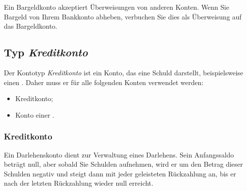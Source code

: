 Ein Bargeldkonto akzeptiert Überweisungen von anderen Konten. Wenn Sie Bargeld von Ihrem Bankkonto abheben, verbuchen Sie dies als Überweisung auf das Bargeldkonto.


\subsection{Typ \emph{Kreditkonto}\label{accounts-type-liabilities}}

Der Kontotyp \emph{Kreditkonto} ist ein Konto, das eine Schuld darstellt, beispielsweise einen . Daher muss er für alle folgenden Konten verwendet werden:
\begin{itemize}
	\item Kreditkonto;
	\item Konto einer .
\end{itemize}


\subsubsection{Kreditkonto\label{accounts-type-liabilities-loan}}

Ein Darlehenskonto dient zur Verwaltung eines Darlehens. Sein Anfangssaldo beträgt null, aber sobald Sie Schulden aufnehmen, wird er um den Betrag dieser Schulden negativ und steigt dann mit jeder geleisteten Rückzahlung an, bis er nach der letzten Rückzahlung wieder null erreicht.

